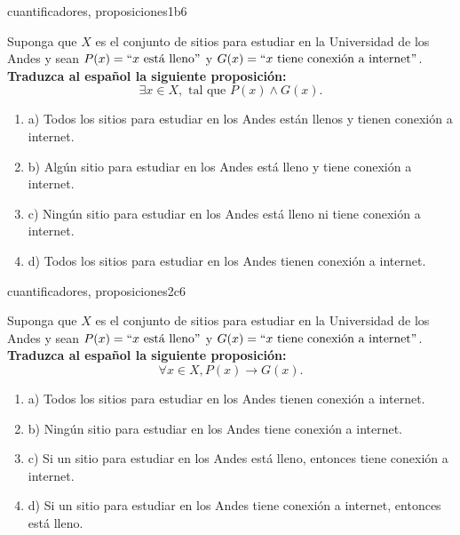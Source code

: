 \documentclass{article}
\begin{document}
\begin{question}{29}{cuantificadores, proposiciones}{1}{b}{6}{
Suponga que $X$ es el conjunto de sitios para estudiar en la Universidad de los Andes y sean $P(x)=``x\text{ está lleno}"$ y $G(x)=``x\text{ tiene conexión a internet}"$.\\

\textbf{Traduzca al español la siguiente proposición:}
\[
\exists x \in X, \text{ tal que } P(x) \land G(x).
\]

\begin{enumerate}
   \item a) Todos los sitios para estudiar en los Andes están llenos y tienen conexión a internet.  
   \item b) Algún sitio para estudiar en los Andes está lleno y tiene conexión a internet.  
   \item c) Ningún sitio para estudiar en los Andes está lleno ni tiene conexión a internet.  
   \item d) Todos los sitios para estudiar en los Andes tienen conexión a internet.  
\end{enumerate}
}
\end{question}

\begin{question}{30}{cuantificadores, proposiciones}{2}{c}{6}{
Suponga que $X$ es el conjunto de sitios para estudiar en la Universidad de los Andes y sean $P(x)=``x\text{ está lleno}"$ y $G(x)=``x\text{ tiene conexión a internet}"$.\\

\textbf{Traduzca al español la siguiente proposición:}
\[
\forall x \in X, P(x) \rightarrow G(x).
\]

\begin{enumerate}
   \item a) Todos los sitios para estudiar en los Andes tienen conexión a internet.  
   \item b) Ningún sitio para estudiar en los Andes tiene conexión a internet.  
   \item c) Si un sitio para estudiar en los Andes está lleno, entonces tiene conexión a internet.  
   \item d) Si un sitio para estudiar en los Andes tiene conexión a internet, entonces está lleno.  
\end{enumerate}
}
\end{question}
\end{document}
